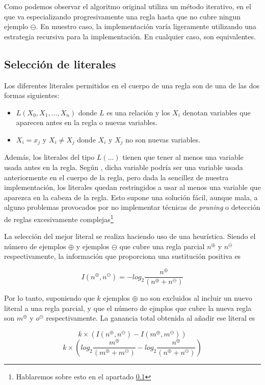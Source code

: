 Como podemos observar el algoritmo original utiliza un método iterativo, en el que va especializando progresivamente una regla hasta que no cubre ningun ejemplo $\ominus$. En muestro caso, la implementación varía ligeramente utilizando una estrategia recursiva para la implementación. En cualquier caso, son equivalentes.

\subsection{Selección de literales}
Los diferentes literales permitidos en el cuerpo de una regla son de una de las dos formas siguientes:
\begin{itemize}
\item $L(X_{0},X_{1},...,X_{n})$ donde $L$ es una relación y los $X_{i}$ denotan variables que aparecen antes en la regla o nuevas variables.
\item $X_{i} = x_{j}$ y $X_{i} \neq X_{j}$ donde $X_{i}$ y $X_{j}$ no son nuevas variables.
\end{itemize}

Además, los literales del tipo $L(...)$ tienen que tener al menos una variable usada antes en la regla. Según \cite{Quinlan1995}, dicha variable podría ser una variable usada anteriormente en el cuerpo de la regla, pero dada la sencillez de nuestra implementación, los literales quedan restringidos a usar al menos una variable que aparezca en la cabeza de la regla. Esto supone una solución fácil, aunque mala, a alguno problemas provocados por no implementar técnicas de \emph{pruning} o detección de reglas excesivamente complejas\footnote{Hablaremos sobre esto en el apartado \ref{}}
  
La selección del mejor literal se realiza haciendo uso de una heurística. Siendo el número de ejemplos $\oplus$ y ejemplos $\ominus$ que cubre una regla parcial $n^{\oplus}$ y $n^{\ominus}$ respectivamente, la información que proporciona una sustitución positiva es

\begin{equation}
  I(n^{\oplus}, n^{\ominus}) = - log_{2} \frac{n^{\oplus}}{(n^{\oplus} + n^{\ominus})}
\end{equation}

Por lo tanto, suponiendo que $k$ ejemplos $\oplus$ no son excluidos al incluir un nuevo literal a una regla parcial, y que el número de ejmplos que cubre la nueva regla son $m^{\oplus}$ y $o^{\ominus}$ respectivamente. La ganancia total obtenida al añadir ese literal es

\begin{equation}
  k \times (I(n^{\oplus}, n^{\ominus}) - I(m^{\oplus}, m^{\ominus})) 
\end{equation}
\begin{equation}
  k \times (log_{2} \frac{m^{\oplus}}{(m^{\oplus} + m^{\ominus})} - log_{2} \frac{n^{\oplus}}{(n^{\oplus} + n^{\ominus})})
\end{equation}
